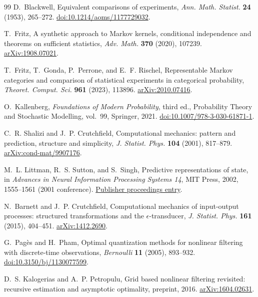 \begin{thebibliography}{99}
D.~Blackwell, Equivalent comparisons of experiments,
\emph{Ann. Math. Statist.} \textbf{24} (1953), 265--272.
\href{https://doi.org/10.1214/aoms/1177729032}{doi:10.1214/aoms/1177729032}.

T.~Fritz, A synthetic approach to Markov kernels, conditional independence
and theorems on sufficient statistics,
\emph{Adv. Math.} \textbf{370} (2020), 107239.
\href{https://arxiv.org/abs/1908.07021}{arXiv:1908.07021}.

T.~Fritz, T.~Gonda, P.~Perrone, and E.~F. Rischel,
Representable Markov categories and comparison of statistical experiments
in categorical probability, \emph{Theoret. Comput. Sci.} \textbf{961}
(2023), 113896.
\href{https://arxiv.org/abs/2010.07416}{arXiv:2010.07416}.

O.~Kallenberg, \emph{Foundations of Modern Probability}, third ed.,
Probability Theory and Stochastic Modelling, vol.~99, Springer, 2021.
\href{https://doi.org/10.1007/978-3-030-61871-1}{doi:10.1007/978-3-030-61871-1}.

C.~R. Shalizi and J.~P. Crutchfield,
Computational mechanics: pattern and prediction, structure and simplicity,
\emph{J. Statist. Phys.} \textbf{104} (2001), 817--879.
\href{https://arxiv.org/abs/cond-mat/9907176}{arXiv:cond-mat/9907176}.

M.~L. Littman, R.~S. Sutton, and S.~Singh,
Predictive representations of state, in \emph{Advances in Neural
Information Processing Systems 14}, MIT Press, 2002, 1555--1561
(2001 conference).
\href{https://papers.nips.cc/paper_files/paper/2001/hash/1e4d36177d71bbb3558e43af9577d70e-Abstract.html}{Publisher proceedings entry}.

N.~Barnett and J.~P. Crutchfield,
Computational mechanics of input-output processes: structured transformations
and the $\epsilon$-transducer, \emph{J. Statist. Phys.} \textbf{161}
(2015), 404--451.
\href{https://arxiv.org/abs/1412.2690}{arXiv:1412.2690}.

G.~Pag\`es and H.~Pham,
Optimal quantization methods for nonlinear filtering with discrete-time
observations, \emph{Bernoulli} \textbf{11} (2005), 893--932.
\href{https://doi.org/10.3150/bj/1130077599}{doi:10.3150/bj/1130077599}.

D.~S. Kalogerias and A.~P. Petropulu,
Grid based nonlinear filtering revisited: recursive estimation and
asymptotic optimality, preprint, 2016.
\href{https://arxiv.org/abs/1604.02631}{arXiv:1604.02631}.


\end{thebibliography}
